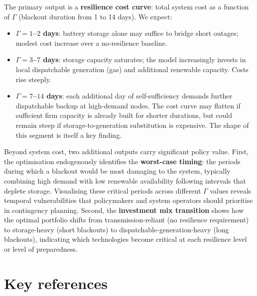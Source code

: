 \documentclass[11pt, a4paper]{article}
\begin{document}
The primary output is a \textbf{resilience cost curve}: total system cost as a function of $\Gamma$ (blackout duration from 1 to 14 days). We expect:
\begin{itemize}[nosep]
\item \textbf{$\Gamma = 1$--$2$ days}: battery storage alone may suffice to bridge short outages; modest cost increase over a no-resilience baseline.
\item \textbf{$\Gamma = 3$--$7$ days}: storage capacity saturates; the model increasingly invests in local dispatchable generation (gas) and additional renewable capacity. Costs rise steeply.
\item \textbf{$\Gamma = 7$--$14$ days}: each additional day of self-sufficiency demands further dispatchable backup at high-demand nodes. The cost curve may flatten if sufficient firm capacity is already built for shorter durations, but could remain steep if storage-to-generation substitution is expensive. The shape of this segment is itself a key finding.
\end{itemize}

Beyond system cost, two additional outputs carry significant policy value. First, the optimisation endogenously identifies the \textbf{worst-case timing}: the periods during which a blackout would be most damaging to the system, typically combining high demand with low renewable availability following intervals that deplete storage. Visualising these critical periods across different $\Gamma$ values reveals temporal vulnerabilities that policymakers and system operators should prioritise in contingency planning. Second, the \textbf{investment mix transition} shows how the optimal portfolio shifts from transmission-reliant (no resilience requirement) to storage-heavy (short blackouts) to dispatchable-generation-heavy (long blackouts), indicating which technologies become critical at each resilience level or level of preparedness.

\section{Key references}

\nocite{*}

\renewcommand{\refname}{}  %


% 

\end{document}
